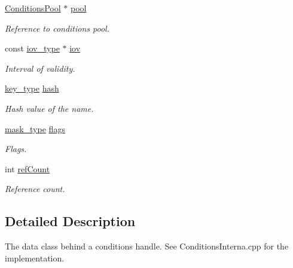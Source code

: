 \begin{DoxyCompactItemize}
\hyperlink{class_d_d4hep_1_1_conditions_1_1_conditions_pool}{ConditionsPool} $\ast$ \hyperlink{class_d_d4hep_1_1_conditions_1_1_interna_1_1_condition_object_a47997f68ec8b07ffe938d869726b6012}{pool}
\begin{DoxyCompactList}\small\item\em Reference to conditions pool. \item\end{DoxyCompactList}\item 
const \hyperlink{class_d_d4hep_1_1_i_o_v}{iov\_\-type} $\ast$ \hyperlink{class_d_d4hep_1_1_conditions_1_1_interna_1_1_condition_object_af04a3341b8791fbcf60fe5e5fff20166}{iov}
\begin{DoxyCompactList}\small\item\em Interval of validity. \item\end{DoxyCompactList}\item 
\hyperlink{class_d_d4hep_1_1_conditions_1_1_interna_1_1_condition_object_a61a3251d047bd75dcdebb0e1c1409101}{key\_\-type} \hyperlink{class_d_d4hep_1_1_conditions_1_1_interna_1_1_condition_object_a6333e2a00c29743a1d64a26356714024}{hash}
\begin{DoxyCompactList}\small\item\em Hash value of the name. \item\end{DoxyCompactList}\item 
\hyperlink{class_d_d4hep_1_1_conditions_1_1_interna_1_1_condition_object_a1a9ff63fe2e060b973e6c2994b0a1370}{mask\_\-type} \hyperlink{class_d_d4hep_1_1_conditions_1_1_interna_1_1_condition_object_ad6e3e4fed5b13ddc85577d1fe5f3fcfd}{flags}
\begin{DoxyCompactList}\small\item\em Flags. \item\end{DoxyCompactList}\item 
int \hyperlink{class_d_d4hep_1_1_conditions_1_1_interna_1_1_condition_object_a0a8d0c67b38ca524010ed5d6ccdd1961}{refCount}
\begin{DoxyCompactList}\small\item\em Reference count. \item\end{DoxyCompactList}\end{DoxyCompactItemize}


\subsection{Detailed Description}
The data class behind a conditions handle. See ConditionsInterna.cpp for the implementation.

